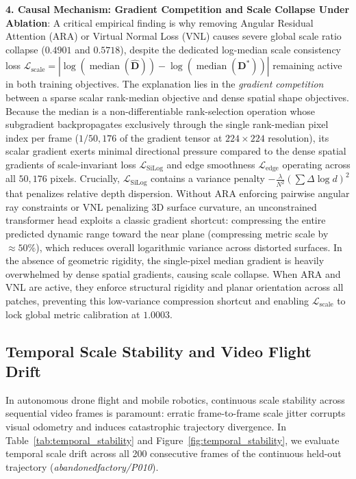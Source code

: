\noindent\textbf{4. Causal Mechanism: Gradient Competition and Scale Collapse Under Ablation}: A critical empirical finding is why removing Angular Residual Attention (ARA) or Virtual Normal Loss (VNL) causes severe global scale ratio collapse ($0.4901$ and $0.5718$), despite the dedicated log-median scale consistency loss $\mathcal{L}_{\text{scale}} = |\log(\operatorname{median}(\hat{\mathbf{D}})) - \log(\operatorname{median}(\mathbf{D}^*))|$ remaining active in both training objectives. The explanation lies in the \textit{gradient competition} between a sparse scalar rank-median objective and dense spatial shape objectives. Because the median is a non-differentiable rank-selection operation whose subgradient backpropagates exclusively through the single rank-median pixel index per frame ($1 / 50{,}176$ of the gradient tensor at $224 \times 224$ resolution), its scalar gradient exerts minimal directional pressure compared to the dense spatial gradients of scale-invariant loss $\mathcal{L}_{\text{SiLog}}$ and edge smoothness $\mathcal{L}_{\text{edge}}$ operating across all $50{,}176$ pixels. Crucially, $\mathcal{L}_{\text{SiLog}}$ contains a variance penalty $-\frac{\lambda}{N^2} (\sum \Delta \log d)^2$ that penalizes relative depth dispersion. Without ARA enforcing pairwise angular ray constraints or VNL penalizing 3D surface curvature, an unconstrained transformer head exploits a classic gradient shortcut: compressing the entire predicted dynamic range toward the near plane (compressing metric scale by $\approx 50\%$), which reduces overall logarithmic variance across distorted surfaces. In the absence of geometric rigidity, the single-pixel median gradient is heavily overwhelmed by dense spatial gradients, causing scale collapse. When ARA and VNL are active, they enforce structural rigidity and planar orientation across all patches, preventing this low-variance compression shortcut and enabling $\mathcal{L}_{\text{scale}}$ to lock global metric calibration at $1.0003$.

\subsection{Temporal Scale Stability and Video Flight Drift}
\label{sec:temporal_stability}

In autonomous drone flight and mobile robotics, continuous scale stability across sequential video frames is paramount: erratic frame-to-frame scale jitter corrupts visual odometry and induces catastrophic trajectory divergence. In Table~\ref{tab:temporal_stability} and Figure~\ref{fig:temporal_stability}, we evaluate temporal scale drift across all 200 consecutive frames of the continuous held-out trajectory (\textit{abandonedfactory/P010}).


